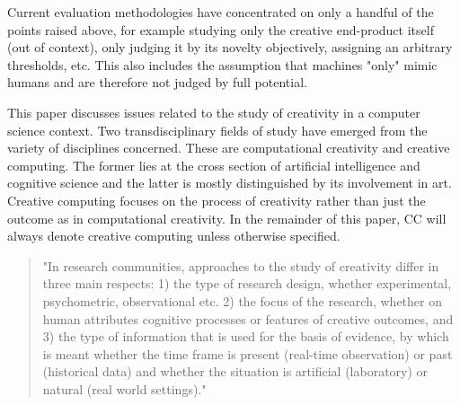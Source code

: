 Current evaluation methodologies have concentrated on only a handful of the points raised above, for example studying only the creative end-product itself (out of context), only judging it by its novelty objectively, assigning an arbitrary thresholds, etc. This also includes the assumption that machines "only" mimic humans and are therefore not judged by full potential.

This paper discusses issues related to the study of creativity in a computer science context. Two transdisciplinary fields of study have emerged from the variety of disciplines concerned. These are computational creativity and creative computing. The former lies at the cross section of artificial intelligence and cognitive science and the latter is mostly distinguished by its involvement in art. Creative computing focuses on the process of creativity rather than just the outcome as in computational creativity. In the remainder of this paper, CC will always denote creative computing unless otherwise specified.

\begin{quote}
  "In research communities, approaches to the study of creativity differ in three main respects: 1) the type of research design, whether experimental, psychometric, observational etc. 2) the focus of the research, whether on human attributes cognitive processes or features of creative outcomes, and 3) the type of information that is used for the basis of evidence, by which is meant whether the time frame is present (real-time observation) or past (historical data) and whether the situation is artificial (laboratory) or natural (real world settings)." \citep[p.3]{Candy2012}
\end{quote}

